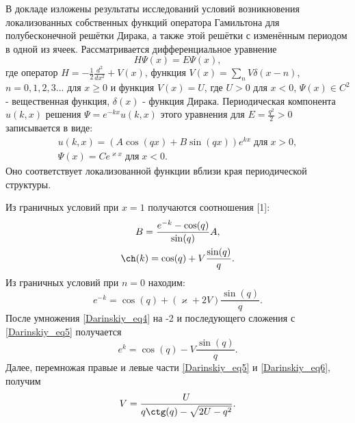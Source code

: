 \vzmscaption

В докладе изложены результаты исследований условий возникновения локализованных собственных функций оператора Гамильтона
для полубесконечной решётки Дирака, а также этой решётки с изменённым периодом в одной из ячеек. Рассматривается дифференциальное уравнение
\begin{equation} \label{Darinskiy_eq1}
 H\Psi(x)=E\Psi(x),
\end{equation}
где оператор $H=-\frac{1}{2}\frac{d^2}{dx^2}+V(x)$, функция $V(x)=\sum\limits_nV\delta(x-n)$, $n=0,1,2,3...$ для $x\geq0$ и
функция $V(x)=U$, где $U>0$ для $x<0$, $\Psi(x)\in C^2$ - вещественная функция,
$\delta(x)$ - функция Дирака. Периодическая компонента $u(k,x)$ решения $\Psi=e^{-kx}u(k,x)$ этого уравнения  для $E=\frac{q^2}{2}>0$ записывается в виде:
\begin{equation} \label{Darinskiy_eq2}
\begin{array}{c}
u(k,x)=(A\cos(qx)+B\sin(qx))e^{kx}\;\text{для}\;x>0,\\
\Psi(x)=Ce^{\varkappa x}\;\text{для}\;x<0.
\end{array}
\end{equation}
Оно соответствует локализованной функции вблизи края периодической структуры.
\par Из граничных условий при $x=1$ получаются соотношения [1]:
\begin{gather}
B=\frac{e^{-k}-\cos(q)}{\sin(q)}A,\\
\ch(k)=\cos(q)+V\frac{\sin(q)}{q}. \label{Darinskiy_eq4}
\end{gather}
Из граничных условий при $n=0$ находим:
\begin{equation}\label{Darinskiy_eq5}
e^{-k}=\cos(q)+\left(\varkappa+2V\right)\frac{\sin(q)}{q}.
\end{equation}
После умножения \eqref{Darinskiy_eq4} на -2 и последующего сложения с \eqref{Darinskiy_eq5} получается
\begin{equation} \label{Darinskiy_eq6}
 e^{k}=\cos(q)-V\frac{\sin(q)}{q}.
\end{equation}
Далее, перемножая правые и левые части \eqref{Darinskiy_eq5} и \eqref{Darinskiy_eq6}, получим
\begin{equation} \label{Darinskiy_eq7}
V=\frac{U}{q\ctg(q)-\sqrt{2U-q^2}}.
\end{equation}
